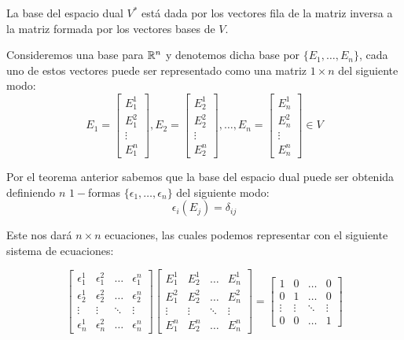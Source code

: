 \begin{example}
  La base del espacio dual $V^{*}$ está dada por los vectores fila de la matriz inversa a la matriz formada por los vectores bases de $V$.

  Consideremos una base para $\mathbb{R}^n$ y denotemos dicha base por $\{E_1,\dots,E_n\}$, cada uno de estos vectores puede ser representado como una matriz $1 \times n$ del siguiente modo:
\[
  E_1 = \begin{bmatrix}
    E_1^1\\[12pt]
    E_1^2\\[12pt]
    \vdots\\[12pt]
    E_1^n
  \end{bmatrix}, E_2 = \begin{bmatrix}
    E_2^1\\[12pt]
    E_2^2 \\[12pt]
    \vdots\\[12pt]
    E_2^n
  \end{bmatrix}, \hdots, E_n = \begin{bmatrix}
    E_n^1\\[12pt]
    E_n^2 \\[12pt]
    \vdots\\[12pt]
    E_n^n
  \end{bmatrix} \in V
\]

  Por el teorema anterior sabemos que la base del espacio dual puede ser obtenida definiendo $n$ $1-$formas $\{\epsilon_1,\dots,\epsilon_n\}$ del siguiente modo:
  \[
    \epsilon_i (E_j) = \delta_{ij}
  \]

  Este nos dará $n \times n$ ecuaciones, las cuales podemos representar con el siguiente sistema de ecuaciones:

\[
  \begin{bmatrix}
    \epsilon_{1}^{1}&\epsilon_{1}^{2}&\hdots&\epsilon_{1}^{n}\\[12pt]
    \epsilon_{2}^{1}&\epsilon_{2}^{2}&\hdots&\epsilon_{2}^{n}\\[12pt]
    \vdots & \vdots & \ddots & \vdots \\[12pt]
    \epsilon_{n}^{1}&\epsilon_{n}^{2}&\hdots&\epsilon_{n}^{n}
  \end{bmatrix}
  \begin{bmatrix}
    E_{1}^{1} & E_{2}^{1} & \hdots & E_{n}^{1}\\[12pt]
    E_{1}^{2} & E_{2}^{2} & \hdots & E_{n}^{2}\\[12pt]
    \vdots & \vdots & \ddots & \vdots \\[12pt]
    E_{1}^{n} & E_{2}^{n} & \hdots & E_{n}^{n}
  \end{bmatrix} = \begin{bmatrix}
    1 & 0 & \hdots & 0\\
    0 & 1 & \hdots & 0\\
    \vdots & \vdots & \ddots & \vdots \\
    0 & 0 & \hdots & 1
  \end{bmatrix}
\]


\end{example}

